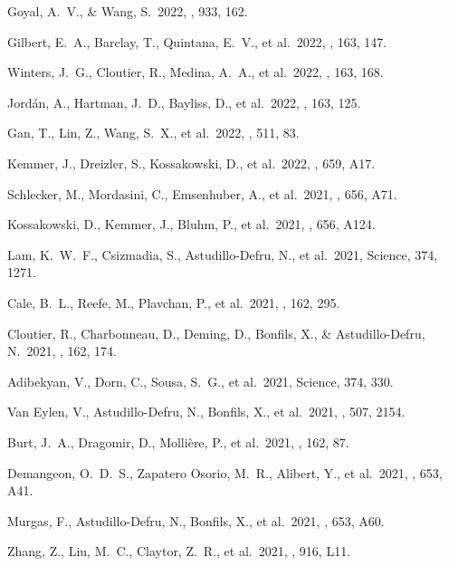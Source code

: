  Goyal, A.~V., \& Wang, S.\ 2022, \apj, 933, 162.

 Gilbert, E.~A., Barclay, T., Quintana, E.~V., et al.\ 2022, \aj, 163, 147.

 Winters, J.~G., Cloutier, R., Medina, A.~A., et al.\ 2022, \aj, 163, 168.

 Jord{\'a}n, A., Hartman, J.~D., Bayliss, D., et al.\ 2022, \aj, 163, 125.

 Gan, T., Lin, Z., Wang, S.~X., et al.\ 2022, \mnras, 511, 83.

 Kemmer, J., Dreizler, S., Kossakowski, D., et al.\ 2022, \aap, 659, A17.

 Schlecker, M., Mordasini, C., Emsenhuber, A., et al.\ 2021, \aap, 656, A71.

 Kossakowski, D., Kemmer, J., Bluhm, P., et al.\ 2021, \aap, 656, A124.

 Lam, K.~W.~F., Csizmadia, S., Astudillo-Defru, N., et al.\ 2021, Science, 374, 1271.

 Cale, B.~L., Reefe, M., Plavchan, P., et al.\ 2021, \aj, 162, 295.

 Cloutier, R., Charbonneau, D., Deming, D., Bonfils, X., \& Astudillo-Defru, N.\ 2021, \aj, 162, 174.

 Adibekyan, V., Dorn, C., Sousa, S.~G., et al.\ 2021, Science, 374, 330.

 Van Eylen, V., Astudillo-Defru, N., Bonfils, X., et al.\ 2021, \mnras, 507, 2154.

 Burt, J.~A., Dragomir, D., Molli{\`e}re, P., et al.\ 2021, \aj, 162, 87.

 Demangeon, O.~D.~S., Zapatero Osorio, M.~R., Alibert, Y., et al.\ 2021, \aap, 653, A41.

 Murgas, F., Astudillo-Defru, N., Bonfils, X., et al.\ 2021, \aap, 653, A60.

 Zhang, Z., Liu, M.~C., Claytor, Z.~R., et al.\ 2021, \apjl, 916, L11.

